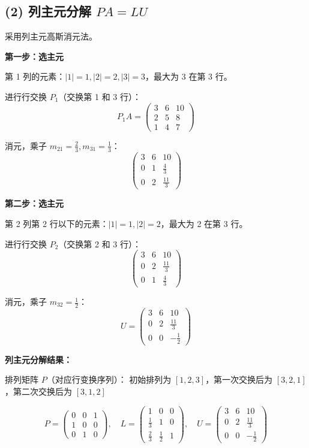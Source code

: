 \documentclass{article}
\begin{document}
\subsection*{(2) 列主元分解 $PA = LU$}
\begin{solution}

  采用列主元高斯消元法。

  \textbf{第一步：选主元}

  第 1 列的元素：$|1| = 1, |2| = 2, |3| = 3$，最大为 3 在第 3 行。

  进行行交换 $P_1$（交换第 1 和 3 行）：
  \[
    P_1 A =
    \begin{pmatrix}3&6&10\\2&5&8\\1&4&7
    \end{pmatrix}
  \]

  消元，乘子 $m_{21} = \frac{2}{3}, m_{31} = \frac{1}{3}$：
  \[
    \begin{pmatrix}3&6&10\\0&1&\frac{4}{3}\\0&2&\frac{11}{3}
    \end{pmatrix}
  \]

  \textbf{第二步：选主元}

  第 2 列第 2 行以下的元素：$|1| = 1, |2| = 2$，最大为 2 在第 3 行。

  进行行交换 $P_2$（交换第 2 和 3 行）：
  \[
    \begin{pmatrix}3&6&10\\0&2&\frac{11}{3}\\0&1&\frac{4}{3}
    \end{pmatrix}
  \]

  消元，乘子 $m_{32} = \frac{1}{2}$：
  \[
    U =
    \begin{pmatrix}3&6&10\\0&2&\frac{11}{3}\\0&0&-\frac{1}{2}
    \end{pmatrix}
  \]

  \textbf{列主元分解结果：}

  排列矩阵 $P$（对应行变换序列）：
  初始排列为 $[1,2,3]$，第一次交换后为 $[3,2,1]$，第二次交换后为 $[3,1,2]$

  \[
    \boxed{
      P =
      \begin{pmatrix}
        0 & 0 & 1 \\
        1 & 0 & 0 \\
        0 & 1 & 0
      \end{pmatrix}, \quad
      L =
      \begin{pmatrix}
        1 & 0 & 0 \\
        \frac{1}{3} & 1 & 0 \\
        \frac{2}{3} & \frac{1}{2} & 1
      \end{pmatrix}, \quad
      U =
      \begin{pmatrix}
        3 & 6 & 10 \\
        0 & 2 &\frac{11}{3} \\
        0 & 0 & -\frac{1}{2}
      \end{pmatrix}
    }
  \]


\end{solution}
\end{document}
